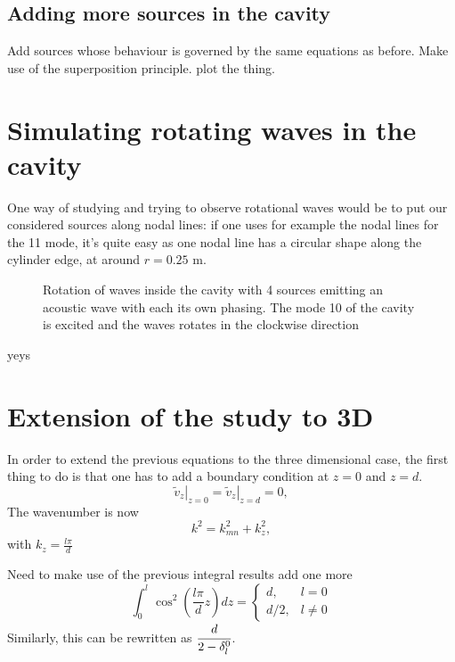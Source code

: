 \documentclass[%
 reprint,
 amsmath,amssymb,
 aip,
]{revtex4-1}
\begin{document}
\subsection{Adding more sources in the cavity}
Add sources whose behaviour is governed by the same equations as before. Make use of the superposition principle. plot the thing. 

\section{Simulating rotating waves in the cavity}
One way of studying and trying to observe rotational waves would be to put our considered sources along nodal lines: if one uses for example the nodal lines for the 11 mode, it's quite easy as one nodal line has a circular shape along the cylinder edge, at around $r = 0.25$ m.
\begin{figure}
   \centering 
   \def\svgwidth{0.5\textwidth}
   
   \caption{Rotation of waves inside the cavity with 4 sources emitting an acoustic wave with each its own phasing. The mode 10 of the cavity is excited and the waves rotates in the clockwise direction} 
   \label{eq:contour_time}
\end{figure}

yeys

\section{Extension of the study to 3D}
In order to extend the previous equations to the three dimensional case, the first thing to do is that one has to add a boundary condition at $z=0$ and $z=d$.
\begin{equation}
   \left. \tilde{v}_z \right|_{z=0} = \left. \tilde{v}_z \right|_{z=d} = 0,
\end{equation}
The wavenumber is now
\begin{equation}
    k^2 = k_{mn}^2 + k_z^2,
\end{equation}
with $k_z = \frac{l \pi}{d}$

Need to make use of the previous integral results add one more
\begin{equation}
    \int_0^l \cos^2\left( \frac{l \pi}{d}z \right) dz = 
    \begin{cases}    
        d, & l = 0\\
        d/2, & l \ne 0
    \end{cases} \label{eq:dp_1}
\end{equation}
Similarly, this can be rewritten as $\cfrac{d}{2 - \delta_l^0}$.
\end{document}
